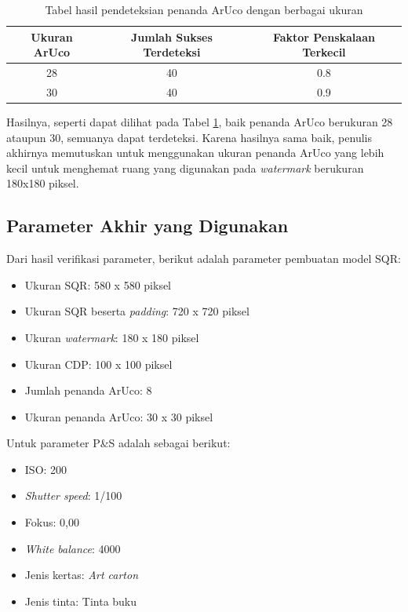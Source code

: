 \begin{table}[h]
	\caption{Tabel hasil pendeteksian penanda ArUco dengan berbagai ukuran}
	\vspace{0.5em}
	\centering
	\begin{tabular}{|c|c|c|}
		\hline
		\textbf{Ukuran ArUco} & \textbf{Jumlah Sukses Terdeteksi} & \textbf{Faktor Penskalaan Terkecil} \\
		\hline
		28                    & 40                                & 0.8                                 \\
		30                    & 40                                & 0.9                                 \\ \hline
	\end{tabular}
	\label{Tab: 4-tabelhasildeteksiaruco2}
\end{table}

Hasilnya, seperti dapat dilihat pada Tabel \ref{Tab: 4-tabelhasildeteksiaruco2}, baik penanda ArUco berukuran 28 ataupun 30, semuanya dapat terdeteksi. Karena
hasilnya sama baik, penulis akhirnya memutuskan untuk menggunakan ukuran penanda ArUco yang lebih kecil untuk menghemat ruang yang digunakan pada
\emph{watermark} berukuran 180x180 piksel.

\subsection{Parameter Akhir yang Digunakan}
\noindent Dari hasil verifikasi parameter, berikut adalah parameter pembuatan model SQR:

\begin{itemize}
	\item Ukuran SQR: 580 x 580 piksel
	\item Ukuran SQR beserta \emph{padding}: 720 x 720 piksel
	\item Ukuran \emph{watermark}: 180 x 180 piksel
	\item Ukuran CDP: 100 x 100 piksel
	\item Jumlah penanda ArUco: 8
	\item Ukuran penanda ArUco: 30 x 30 piksel
\end{itemize}

\noindent Untuk parameter P\&S adalah sebagai berikut:
\begin{itemize}
	\item ISO: 200
	\item \emph{Shutter speed}: 1/100
	\item Fokus: 0,00
	\item \emph{White balance}: 4000
	\item Jenis kertas: \emph{Art carton}
	\item Jenis tinta: Tinta buku
\end{itemize}

